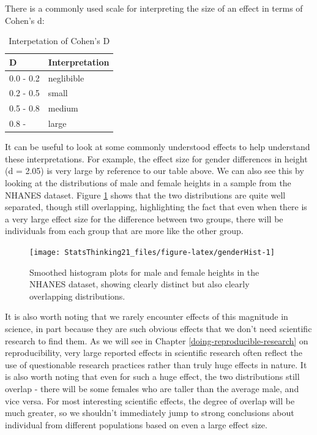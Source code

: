 \documentclass[12pt,]{book}
\theoremstyle{definition}
\theoremstyle{definition}
\theoremstyle{definition}
\theoremstyle{remark}
\begin{document}
There is a commonly used scale for interpreting the size of an effect in terms of Cohen's d:

\begin{table}

\caption{\label{tab:unnamed-chunk-53}Interpetation of Cohen's D}
\centering
\begin{tabular}[t]{l|l}
\hline
D & Interpretation\\
\hline
0.0 - 0.2 & neglibible\\
\hline
0.2 - 0.5 & small\\
\hline
0.5 - 0.8 & medium\\
\hline
0.8 - & large\\
\hline
\end{tabular}
\end{table}

It can be useful to look at some commonly understood effects to help understand these interpretations. For example, the effect size for gender differences in height (d = 2.05) is very large by reference to our table above. We can also see this by looking at the distributions of male and female heights in a sample from the NHANES dataset. Figure \ref{fig:genderHist} shows that the two distributions are quite well separated, though still overlapping, highlighting the fact that even when there is a very large effect size for the difference between two groups, there will be individuals from each group that are more like the other group.

\begin{figure}
\texttt{[image: StatsThinking21\_files/figure-latex/genderHist-1]} \caption{Smoothed histogram plots for male and female heights in the NHANES dataset, showing clearly distinct but also clearly overlapping distributions.}\label{fig:genderHist}
\end{figure}

It is also worth noting that we rarely encounter effects of this magnitude in science, in part because they are such obvious effects that we don't need scientific research to find them. As we will see in Chapter \ref{doing-reproducible-research} on reproducibility, very large reported effects in scientific research often reflect the use of questionable research practices rather than truly huge effects in nature. It is also worth noting that even for such a huge effect, the two distributions still overlap - there will be some females who are taller than the average male, and vice versa. For most interesting scientific effects, the degree of overlap will be much greater, so we shouldn't immediately jump to strong conclusions about individual from different populations based on even a large effect size.
\end{document}
